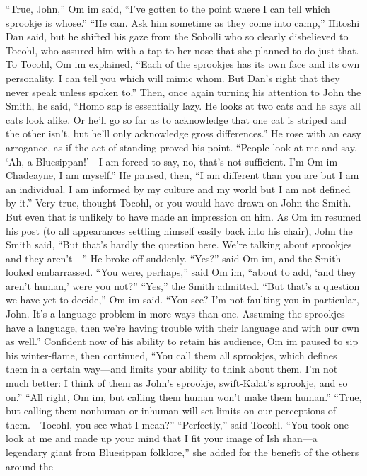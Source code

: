 \documentclass[9pt]{article}
\begin{document}
“True, John,” Om im said, “I’ve gotten to the point where I can tell which sprookje is whose.”
“He can. Ask him sometime as they come into camp,” Hitoshi Dan said, but he shifted his gaze from
the Sobolli who so clearly disbelieved to Tocohl, who assured him with a tap to her nose that she
planned to do just that.
To Tocohl, Om im explained, “Each of the sprookjes has its own face and its own personality. I can
tell you which will mimic whom. But Dan’s right that they never speak unless spoken to.”
Then, once again turning his attention to John the Smith, he said, “Homo sap is essentially lazy. He
looks at two cats and he says all cats look alike. Or he’ll go so far as to acknowledge that one cat is
striped and the other isn’t, but he’ll only acknowledge gross differences.”
He rose with an easy arrogance, as if the act of standing proved his point. “People look at me and
say, ‘Ah, a Bluesippan!’—I am forced to say, no, that’s not sufficient. I’m Om im Chadeayne, I am
myself.” He paused, then, “I am different than you are but I am an individual. I am informed by my
culture and my world but I am not defined by it.”
Very true, thought Tocohl, or you would have drawn on John the Smith. But even that is unlikely to
have made an impression on him.
As Om im resumed his post (to all appearances settling himself easily back into his chair), John the
Smith said, “But that’s hardly the question here. We’re talking about sprookjes and they aren’t—” He
broke off suddenly.
“Yes?” said Om im, and the Smith looked embarrassed.
“You were, perhaps,” said Om im, “about to add, ‘and they aren’t human,’ were you not?”
“Yes,” the Smith admitted.
“But that’s a question we have yet to decide,” Om im said. “You see? I’m not faulting you in
particular, John. It’s a language problem in more ways than one. Assuming the sprookjes have a
language, then we’re having trouble with their language and with our own as well.”
Confident now of his ability to retain his audience, Om im paused to sip his winter-flame, then
continued, “You call them all sprookjes, which defines them in a certain way—and limits your ability to
think about them. I’m not much better: I think of them as John’s sprookje, swift-Kalat’s sprookje, and so
on.”
“All right, Om im, but calling them human won’t make them human.”
“True, but calling them nonhuman or inhuman will set limits on our perceptions of them.—Tocohl, you
see what I mean?”
“Perfectly,” said Tocohl. “You took one look at me and made up your mind that I fit your image of
Ish shan—a legendary giant from Bluesippan folklore,” she added for the benefit of the others around the
\end{document}
